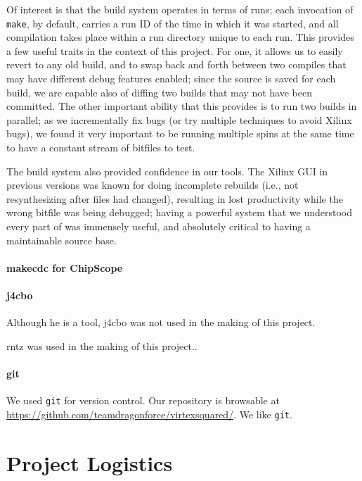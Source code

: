 \documentclass[10pt]{article}
\begin{document}
Of interest is that the build system operates in terms of runs; each
invocation of \texttt{make}, by default, carries a run ID of the time in which it was
started, and all compilation takes place within a run directory unique to
each run. This provides a few useful traits in the context of this project.
For one, it allows us to easily revert to any old build, and to swap back
and forth between two compiles that may have different debug features
enabled; since the source is saved for each build, we are capable also of
diffing two builds that may not have been committed. The other important
ability that this provides is to run two builds in parallel; as we
incrementally fix bugs (or try multiple techniques to avoid Xilinx bugs), we
found it very important to be running multiple spins at the same time to
have a constant stream of bitfiles to test.

The build system also provided confidence in our tools. The Xilinx GUI in
previous versions was known for doing incomplete rebuilds (i.e., not
resynthesizing after files had changed), resulting in lost productivity
while the wrong bitfile was being debugged; having a powerful system that we
understood every part of was immensely useful, and absolutely critical to
having a maintainable source base.

\subsection{makecdc for ChipScope}

\subsection{j4cbo}

Although he is a tool, j4cbo was not used in the making of this project.

rntz was used in the making of this project..

\subsection{git}

We used \texttt{git} for version control. Our repository is browsable at
\url{https://github.com/teamdragonforce/virtexsquared/}. We like \texttt{git}.

\part{Project Logistics}
\end{document}
